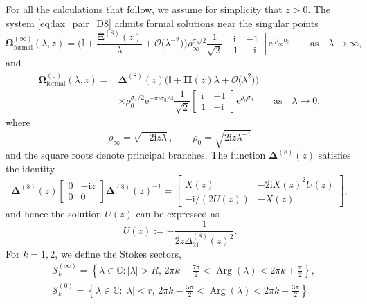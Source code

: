 \documentclass[11pt]{article}
\numberwithin{equation}{section}
\numberwithin{equation}{section}
\newcommand{\ee}{\mathrm{e}}
\newcommand{\ii}{\mathrm{i}}
\newcommand{\C}{{\mathbb{C}}}
\renewcommand{\arg}{\operatorname{Arg}}
\begin{document}
For all the calculations that follow, we assume for simplicity that $z > 0$. The system \eqref{eq:lax_pair_D8} admits formal solutions near the singular points
\begin{equation}\label{eq:Omega-expand-infty-early}
\mathbf{\Omega}_{\text{formal}}^{(\infty)}(\lambda,z) = \bigg( \mathbb{I} + \frac{\mathbf{\Xi}^{(8)}(z)}{\lambda}+\mathcal{O}\big(\lambda^{-2}\big) \bigg) \rho_\infty^{\sigma_3/2}
 {\dfrac{1}{\sqrt{2}}} \begin{bmatrix} \ii & -1\\ 1 &-\ii \end{bmatrix} \ee^{\ii \rho_\infty \sigma_3} \qquad \text{as} \quad \lambda \to \infty,
\end{equation}
and
\begin{align}
\mathbf{\Omega}^{(0)}_{\text{formal}}(\lambda, z) ={}& {\mathbf{\Delta}}^{(8)}(z)\big( \mathbb{I} +\mathbf{\Pi}(z)\lambda+ \mathcal{O}\big(\lambda^2\big) \big)\nonumber\\
&\times\rho_0^{\sigma_3/2} \ee^{-\pi \ii \sigma_3/4}{\dfrac{1}{\sqrt{2}}} {}{} \begin{bmatrix} \ii & -1 \\ 1 &-\ii \end{bmatrix} \ee^{ \rho_0 \sigma_3} \qquad \text{as} \quad \lambda \to 0,\label{eq:Omega-expand-zero-early}
\end{align}
where
\begin{equation*}
\rho_\infty=\sqrt{-2 \ii z\lambda},\qquad \rho_0= \sqrt{2 \ii z\lambda^{-1}}
\end{equation*}
 and the square roots denote principal branches.
The function ${\mathbf{\Delta}}^{(8)}(z)$ satisfies the identity
\begin{equation}
{\mathbf{\Delta}}^{(8)}(z)\begin{bmatrix}0&-\ii z\\0&0\end{bmatrix}{\mathbf{\Delta}}^{(8)}(z)^{-1}=\begin{bmatrix}X(z) & -2\ii X(z)^2U(z)\\-\ii/(2U(z)) & -X(z)\end{bmatrix},
\label{eq:Delta-U-X-identity}
\end{equation}
and hence the solution $U(z)$ can be expressed as
\begin{equation}\label{eq:un-U-early}
U(z):=-\frac{1}{2z\Delta^{(8)}_{21}(z)^2}.
\end{equation}
For $k = 1, 2$, we define the Stokes sectors,
\begin{align*}
&\mathcal S_k^{(\infty)}= \left \{ \lambda \in \C \colon  |\lambda| > R, \, 2\pi k - \frac{7\pi}{2} < \arg (\lambda) < 2\pi k+\frac{\pi}{2} \right \},\\
&\mathcal S_k^{(0)}= \left \{ \lambda \in \C \colon  |\lambda| < r, \, 2\pi k - \frac{5\pi}{2} < \arg (\lambda) < 2\pi k+\frac{3\pi}{2}\right \}.
\end{align*}
\end{document}
